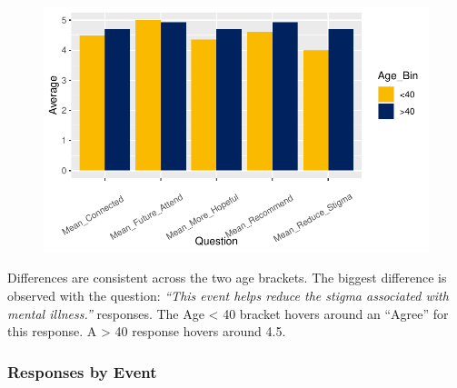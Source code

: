 \documentclass[
  letterpaper,
  DIV=11,
  numbers=noendperiod]{scrartcl}
\begin{document}
\begin{figure}[H]

{\centering \includegraphics{ytp_post_event_survey_files/figure-pdf/unnamed-chunk-13-1.pdf}

}

\end{figure}

Differences are consistent across the two age brackets. The biggest
difference is observed with the question: \emph{``This event helps
reduce the stigma associated with mental illness.''} responses. The Age
\textless{} 40 bracket hovers around an ``Agree'' for this response. A
\textgreater{} 40 response hovers around 4.5.

\hypertarget{responses-by-event}{%
\subsubsection{Responses by Event}\label{responses-by-event}}
\end{document}
